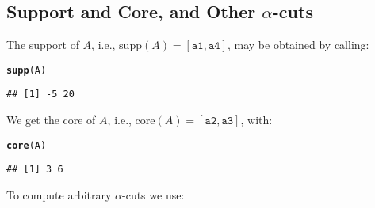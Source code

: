 \documentclass[11pt]{article}\usepackage[]{graphicx}\usepackage[]{color}
\makeatletter
\newcommand{\hlstd}[1]{\textcolor[rgb]{0.345,0.345,0.345}{#1}}%
\newcommand{\hlkwd}[1]{\textcolor[rgb]{0.737,0.353,0.396}{\textbf{#1}}}%
\newenvironment{kframe}{%
 \def\at@end@of@kframe{}%
 \ifinner\ifhmode%
  \def\at@end@of@kframe{\end{minipage}}%
  \begin{minipage}{\columnwidth}%
 \fi\fi%
 \def\FrameCommand##1{\hskip\@totalleftmargin \hskip-\fboxsep
 \colorbox{shadecolor}{##1}\hskip-\fboxsep
     \hskip-\linewidth \hskip-\@totalleftmargin \hskip\columnwidth}%
 \MakeFramed {\advance\hsize-\width
   \@totalleftmargin\z@ \linewidth\hsize
   \@setminipage}}%
 {\par\unskip\endMakeFramed%
 \at@end@of@kframe}
\newenvironment{knitrout}{}{} %
\makeatother
\begin{document}
\subsection{Support and Core, and Other $\alpha$-cuts}

The support of $A$, i.e., $\mathrm{supp}(A)=[\mathtt{a1}, \mathtt{a4}]$,
may be obtained by calling:

\begin{knitrout}\small
{}\color{fgcolor}\begin{kframe}
\begin{alltt}
\hlkwd{supp}\hlstd{(A)}
\end{alltt}
\begin{verbatim}
## [1] -5 20
\end{verbatim}
\end{kframe}
\end{knitrout}

\noindent
We get the core of $A$, i.e., $\mathrm{core}(A)=[\mathtt{a2}, \mathtt{a3}]$,
with:

\begin{knitrout}\small
{}\color{fgcolor}\begin{kframe}
\begin{alltt}
\hlkwd{core}\hlstd{(A)}
\end{alltt}
\begin{verbatim}
## [1] 3 6
\end{verbatim}
\end{kframe}
\end{knitrout}

\noindent
To compute arbitrary $\alpha$-cuts we use:
\end{document}
